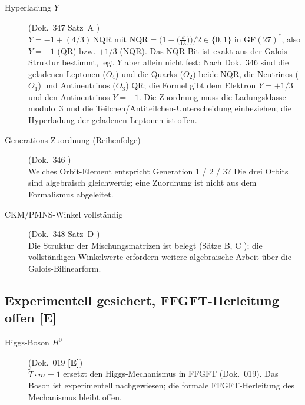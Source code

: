 \begin{description}

\item[Hyperladung $Y$] (Dok.~347 Satz~A \SM)\\
$Y = -1 + (4/3)\,\mathrm{NQR}$ mit $\mathrm{NQR} = \bigl(1 - \bigl(\tfrac{k}{13}\bigr)\bigr)/2 \in \{0,1\}$
in GF$(27)^*$, also $Y = -1$ (QR) bzw. $+1/3$ (NQR). Das NQR-Bit ist exakt
aus der Galois-Struktur bestimmt, legt $Y$ aber allein nicht fest: Nach
Dok.~346 sind die geladenen Leptonen ($O_4$) und die Quarks ($O_2$) beide NQR,
die Neutrinos ($O_1$) und Antineutrinos ($O_3$) QR; die Formel gibt dem
Elektron $Y = +1/3$ und den Antineutrinos $Y = -1$. Die Zuordnung muss die
Ladungsklasse modulo~3 und die Teilchen/Antiteilchen-Unterscheidung
einbeziehen; die Hyperladung der geladenen Leptonen ist offen.

\item[Generations-Zuordnung (Reihenfolge)] (Dok.~346 \SM)\\
Welches Orbit-Element entspricht Generation 1 / 2 / 3?
Die drei Orbits sind algebraisch gleichwertig; eine Zuordnung
ist nicht aus dem Formalismus abgeleitet.

\item[CKM/PMNS-Winkel vollständig] (Dok.~348 Satz~D \SM)\\
Die Struktur der Mischungsmatrizen ist belegt (Sätze B, C \BM);
die vollständigen Winkelwerte erfordern weitere algebraische
Arbeit über die Galois-Bilinearform.

\end{description}

\subsection*{Experimentell gesichert, FFGFT-Herleitung offen \textbf{[E]}}

\begin{description}

\item[Higgs-Boson $H^0$] (Dok.~019 \textbf{[E]})\\
$\tilde{T} \cdot m = 1$ ersetzt den Higgs-Mechanismus in FFGFT
(Dok.~019). Das Boson ist experimentell nachgewiesen;
die formale FFGFT-Herleitung des Mechanismus bleibt offen.

\end{description}
